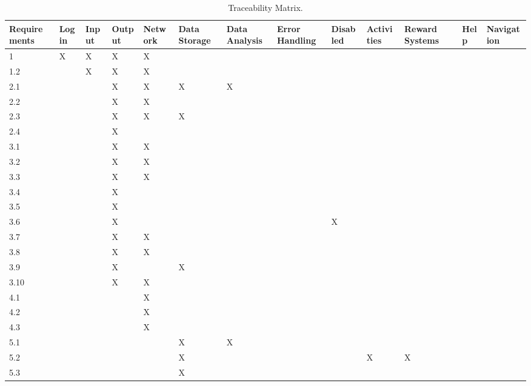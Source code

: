 \documentclass[10pt]{article}
\begin{document}
 \begin{longtable}[c]{ |p{2cm}|p{1cm}|p{1cm}|p{1cm}|p{1cm}|p{1cm}|p{1cm}|p{1cm}|p{1cm}|p{1cm}|p{1cm}|p{1cm}|p{1cm}|  }
 \caption{Traceability Matrix.\label{long}}\\
 \hline
 Requirements & Login & Input & Output & Network & Data Storage & Data Analysis &Error Handling &Disabled&Activities &Reward Systems & Help & Navigat
 ion\\
 \hline
 1& X & X  & X  & X  &   &   &   &   &   &   &   &\\
 \hline
 1.2&  &X   &X   & X  &   &   &   &   &   &   &   &\\
 \hline
 2.1&  &   &  X & X  &  X &  X &   &   &   &   &   &\\
 \hline
 2.2&  &   & X  & X  &   &   &   &   &   &   &   &\\
 \hline
 2.3&  &   & X  & X  &  X &   &   &   &   &   &   &\\
 \hline
 2.4&  &   & X  &   &   &   &   &   &   &   &   &\\
 \hline
 3.1&  &   & X  & X  &   &   &   &   &   &   &   &\\
 \hline
 3.2&  &   & X  & X  &  &   &   &   &   &   &   &\\
 \hline
 3.3&  &   & X  & X  &  &   &   &   &   &   &   &\\
 \hline
 3.4&  &   & X  &   &   &   &   &   &   &   &   &\\
 \hline
 3.5&  &   &  X &   &   &   &   &   &   &   &   &\\
 \hline
 3.6&  &   &  X &   &   &   &   & X  &   &   &   &\\
 \hline
 3.7&  &   &  X & X  &   &   &   &   &   &   &   &\\
 \hline
 3.8&  &   &  X & X  &  &   &   &   &   &   &   &\\
 \hline
 3.9&  &   &  X &   &  X &   &   &   &   &   &   &\\
 \hline
 3.10&  &   & X  & X  &   &   &   &   &   &   &   &\\
 \hline
 4.1&  &   &   &  X &   &   &   &   &   &   &   &\\
 \hline
 4.2&  &   &   & X  &   &   &   &   &   &   &   &\\
 \hline
 4.3&  &   &   & X  &   &   &   &   &   &   &   &\\
 \hline
 5.1&  &   &   &   & X  & X  &   &   &   &   &   &\\
 \hline
 5.2&  &   &   &   &  X &   &   &   &X   &X   &   &\\
 \hline
 5.3&  &   &   &   & X  &   &   &   &   &   &   &\\

\end{longtable}
\end{document}
